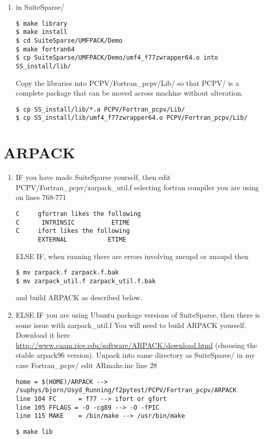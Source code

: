 \documentclass[11pt,a4paper,twoside]{report}
\begin{document}
\begin{enumerate}
\item in SuiteSparse/
\begin{lstlisting}
$ make library
$ make install
$ cd SuiteSparse/UMFPACK/Demo
$ make fortran64
$ cp SuiteSparse/UMFPACK/Demo/umf4_f77zwrapper64.o into SS_install/lib/
\end{lstlisting}
Copy the libraries into PCPV/Fortran\_pcpv/Lib/ so that PCPV/ is a complete package that can be moved across machine without alteration.

\begin{lstlisting}
$ cp SS_install/lib/*.a PCPV/Fortran_pcpv/Lib/
$ cp SS_install/lib/umf4_f77zwrapper64.o PCPV/Fortran_pcpv/Lib/
\end{lstlisting}
\end{enumerate}





\section{ARPACK}
\label{ARPACK}
\begin{enumerate}
\item IF you have made SuiteSparse yourself, then edit PCPV/Fortran\_pcpv/zarpack\_util.f 
selecting fortran compiler you are using on lines 768-771
\begin{lstlisting}
C     gfortran likes the following
C      INTRINSIC          ETIME
C     ifort likes the following
      EXTERNAL           ETIME
\end{lstlisting}

ELSE IF, when running \CodeName there are errors involving zneupd or znaupd then
\begin{lstlisting}
$ mv zarpack.f zarpack.f.bak
$ mv zarpack_util.f zarpack_util.f.bak
\end{lstlisting}
and build ARPACK as described below.
 

\item ELSE IF you are using Ubuntu package versions of SuiteSparse, then there is some issue with zarpack\_util.f
You will need to build ARPACK yourself. Download it here \href{http://www.caam.rice.edu/software/ARPACK/download.html}{http://www.caam.rice.edu/software/ARPACK/download.html} (choosing the stable arpack96 version).
Unpack into same directory as SuiteSparse/ in my case Fortran\_pcpv/
edit ARmake.inc
line 28 
\begin{lstlisting}
home = $(HOME)/ARPACK --> /suphys/bjorn/Usyd_Running/f2pytest/PCPV/Fortran_pcpv/ARPACK
line 104 FC      = f77 --> ifort or gfort
line 105 FFLAGS = -O -cg89 --> -O -fPIC
line 115 MAKE    = /bin/make --> /usr/bin/make
\end{lstlisting}

\begin{lstlisting}
$ make lib
\end{lstlisting}
\end{enumerate}
\end{document}
